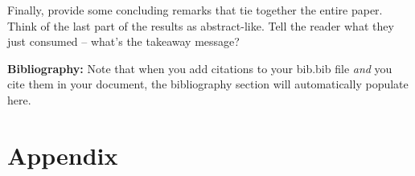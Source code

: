 \documentclass{article}\usepackage[]{graphicx}\usepackage[]{xcolor}
\begin{document}
\begin{multicols}{2}
Finally, provide some concluding remarks that tie together the entire paper. Think of the last part of the results as abstract-like. Tell the reader what they just consumed -- what's the takeaway message?

\vspace{2em}

\noindent\textbf{Bibliography:} Note that when you add citations to your bib.bib file \emph{and}
you cite them in your document, the bibliography section will automatically populate here.

\begin{tiny}

\end{tiny}
\end{multicols}

\newpage
\onecolumn
\section{Appendix}
\end{document}
